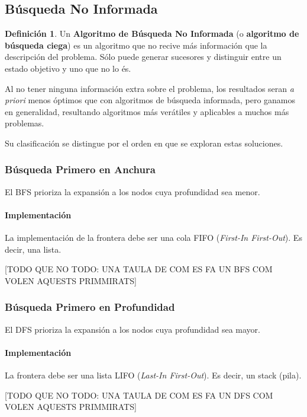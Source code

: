 \documentclass[12pt,a4paper,catalan, leqno]{article} %
\theoremstyle{definition}
\newtheorem{defn}{Definición}[section]
\begin{document}
\subsection{Búsqueda No Informada}

\begin{defn}
Un \textbf{Algoritmo de Búsqueda No Informada} (o \textbf{algoritmo de búsqueda ciega}) es un algoritmo que no recive más información que la descripción del problema. Sólo puede generar sucesores y distinguir entre un estado objetivo y uno que no lo és.
\end{defn}

Al no tener ninguna información extra sobre el problema, los resultados seran \textit{a priori} menos óptimos que con algoritmos de búsqueda informada, pero ganamos en generalidad, resultando algoritmos más verátiles y aplicables a muchos más problemas.

Su clasificación se distingue por el orden en que se exploran estas soluciones.

\subsubsection{Búsqueda Primero en Anchura}

El BFS prioriza la expansión a los nodos cuya profundidad sea menor.
\paragraph{Implementación}
La implementación de la frontera debe ser una cola FIFO (\textit{First-In First-Out}). Es decir, una lista.

[TODO QUE NO TODO: UNA TAULA DE COM ES FA UN BFS COM VOLEN AQUESTS PRIMMIRATS]

\subsubsection{Búsqueda Primero en Profundidad}

El DFS prioriza la expansión a los nodos cuya profundidad sea mayor. 

\paragraph{Implementación}
La frontera debe ser una lista LIFO (\textit{Last-In First-Out}). Es decir, un stack (pila).

[TODO QUE NO TODO: UNA TAULA DE COM ES FA UN DFS COM VOLEN AQUESTS PRIMMIRATS]
\end{document}
